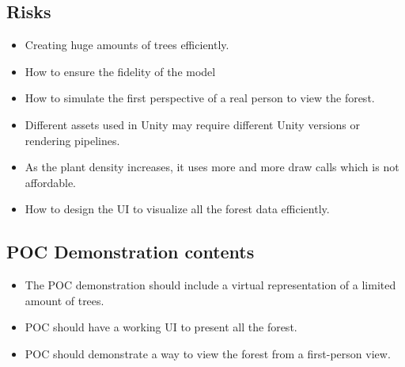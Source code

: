 \documentclass{article}
\begin{document}
\subsection{Risks}
\begin{itemize}
\item Creating huge amounts of trees efficiently.
\item How to ensure the fidelity of the model
\item How to simulate the first perspective of a real 
person to view the forest.
\item Different assets used in Unity may require different Unity versions or rendering pipelines.
\item As the plant density increases, it uses more and more draw calls which is not affordable.
\item How to design the UI to visualize all the forest 
data efficiently.
\end{itemize}


\subsection{POC Demonstration contents}
\begin{itemize}
\item The POC demonstration should include a virtual
representation of a limited amount of trees.
\item POC should have a working UI to present all the 
forest. 
\item POC should demonstrate a way to view the forest 
from a first-person view.
\end{itemize}

\newpage
\end{document}

